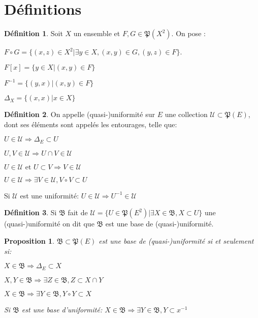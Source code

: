 \documentclass[a4paper, 11pt, french]{book}
\newenvironment{itemise}{\itemize}{\enditemize}
\theoremstyle{plain} %
\newtheorem{proposition}{Proposition}
\theoremstyle{definition} %
\newtheorem{definition}{Définition}
\theoremstyle{remark} %
\newcommand{\1}{\mathds{1}}
\newcommand{\inv}[1]{#1^{-1}}
\newcommand\et{\text{ et }}
\begin{document}
\section{Définitions}

\begin{definition}
	Soit $X$ un ensemble et $F, G\in\mathfrak{P}(X^2)$.
	On pose :
	\begin{itemise}
		\item $F\circ G=\{(x, z)\in X^2 | \exists y\in X, (x, y)\in G, (y, z)\in F\}$.
		\item $F[x]=\{y\in X | (x, y)\in F\}$
		\item $\inv{F}=\{(y, x) | (x, y)\in F\}$
		\item $\Delta_X=\{(x, x) | x\in X\}$
	\end{itemise}
\end{definition}

\begin{definition}
	On appelle (quasi-)uniformité sur $E$ une collection $\mathscr{U}\subset\mathfrak{P}(E)$, dont ses éléments sont appelés les entourages, telle que:
	\begin{itemise}
		\item $U\in\mathscr{U}\Rightarrow\Delta_E\subset U$
		\item $U, V\in\mathscr{U}\Rightarrow U\cap V\in\mathscr{U}$
		\item $U\in\mathscr{U}\et U\subset V\Rightarrow V\in\mathscr{U}$
		\item $U\in\mathscr{U}\Rightarrow\exists V\in\mathscr{U}, V\circ V\subset U$
		\item Si $\mathscr{U}$ est une uniformité: $U\in\mathscr{U}\Rightarrow\inv{U}\in\mathscr{U}$
	\end{itemise}
\end{definition}

\begin{definition}
	Si $\mathfrak{B}$ fait de $\mathscr{U}=\{U\in\mathfrak{P}(E^2) | \exists X\in\mathfrak{B}, X\subset U\}$ une (quasi-)uniformité on dit que $\mathfrak{B}$ est une base de (quasi-)uniformité.
\end{definition}

\begin{proposition}
	$\mathfrak{B}\subset\mathfrak{P}(E)$ est une base de (quasi-)uniformité si et seulement si:
	\begin{itemise}
		\item $X\in\mathfrak{B}\Rightarrow\Delta_E\subset X$
		\item $X, Y\in\mathfrak{B}\Rightarrow\exists Z\in\mathfrak{B}, Z\subset X\cap Y$
		\item $X\in\mathfrak{B}\Rightarrow\exists Y\in\mathfrak{B}, Y\circ Y\subset X$
		\item Si $\mathfrak{B}$ est une base d'uniformité: $X\in\mathfrak{B}\Rightarrow\exists Y\in\mathfrak{B}, Y\subset x^{-1}$
	\end{itemise}
\end{proposition}
\end{document}
